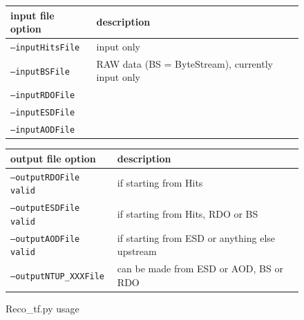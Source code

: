 \begin{figure}[h]
\begin{center}
\scriptsize
\begin{tabular}{p{3 cm}p{7 cm}}
\hline\hline
input file option&description\\
\hline
\texttt{--inputHitsFile}&input only\\
\texttt{--inputBSFile}&RAW data (BS = ByteStream), currently input only\\
\texttt{--inputRDOFile}&\\
\texttt{--inputESDFile}&\\
\texttt{--inputAODFile}&\\
\hline\hline
\end{tabular}
\end{center}
\mbox{}\newline
\begin{center}
\scriptsize
\begin{tabular}{p{3 cm}p{7 cm}}
\hline\hline
output file option&description\\
\hline
\texttt{--outputRDOFile	valid}&if starting from Hits\\
\texttt{--outputESDFile	valid}&if starting from Hits, RDO or BS\\
\texttt{--outputAODFile	valid}&if starting from ESD or anything else upstream\\
\texttt{--outputNTUP\_XXXFile}&can be made from ESD or AOD, BS or RDO\\
\hline\hline
\end{tabular}
\end{center}
\caption{Reco\_tf.py usage}
\end{figure}
